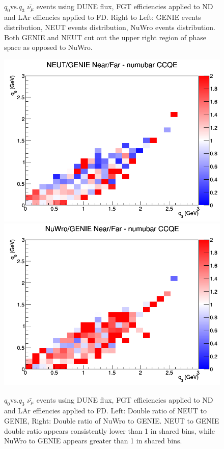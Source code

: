 \documentclass[12pt]{article}
\begin{document}
\begin{figure}[h]
\endminipage
\caption{$q_0 \textrm{vs.} q_3$ $\bar{\nu_{\mu}}$ events using DUNE flux, FGT efficiencies applied to ND and LAr effiencies applied to FD. Right to Left: GENIE events distribution, NEUT events distribution, NuWro events distribution. Both GENIE and NEUT cut out the upper right region of phase space as opposed to NuWro.}
\label{fig:q0q3_numubar_CCQE_events_FGT_eff}
\end{figure}
\begin{figure}[h]
\centering
{}
\includegraphics[width=\linewidth]{eff_q0_q3/FGT/ratios/CCQE_NEUT_GENIE_numubar_NF_q3_q0.png}
\endminipage
{}
\includegraphics[width=\linewidth]{eff_q0_q3/FGT/ratios/CCQE_NuWro_GENIE_numubar_NF_q3_q0.png}
\endminipage
\caption{$q_0 \textrm{vs.} q_3$ $\bar{\nu_{\mu}}$ events using DUNE flux, FGT efficiencies applied to ND and LAr effiencies applied to FD. Left: Double ratio of NEUT to GENIE, Right: Double ratio of NuWro to GENIE. NEUT to GENIE double ratio appears consistently lower than 1 in shared bins, while NuWro to GENIE appears greater than 1 in shared bins.}
\label{fig:q0q3_numubar_CCQE_FGT_eff}
\end{figure}
\end{document}
